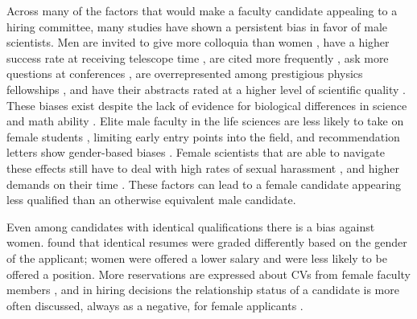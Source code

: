 \documentclass[modern]{aastex62}
\begin{document}
Across many of the factors that would make a faculty candidate appealing to a hiring committee, many studies have shown a persistent bias in favor of male scientists. Men are invited to give more colloquia than women \citep{nit17}, have a higher success rate at receiving telescope time \citep{rei14,lon16,pat16,spe18}, are cited more frequently \citep{cap17}, ask more questions at conferences \citep{dav14,pri14,sch17a,sch17}, are overrepresented among prestigious physics fellowships \citep{nor18}, and have their abstracts rated at a higher level of scientific quality \citep{kno13}. These biases exist despite the lack of evidence for biological differences in science and math ability \citep{hyd05,gig17}. Elite male faculty in the life sciences are less likely to take on female students \citep{she14}, limiting early entry points into the field, and recommendation letters show gender-based biases \citep{dut16,mad18}.  Female scientists that are able to navigate these effects still have to deal with high rates of sexual harassment \citep{cla14,nat18}, and higher demands on their time \citep{el18}. These factors can lead to a female candidate appearing less qualified than an otherwise equivalent male candidate. 


Even among candidates with identical qualifications there is a bias against women. \citet{mos12} found that identical resumes were graded differently based on the gender of the applicant; women were offered a lower salary and were less likely to be offered a position. More reservations are expressed about CVs from female faculty members \citep{ste99}, and in hiring decisions the relationship status of a candidate is more often discussed, always as a negative, for female applicants \citep{riv17}. 
\end{document}
